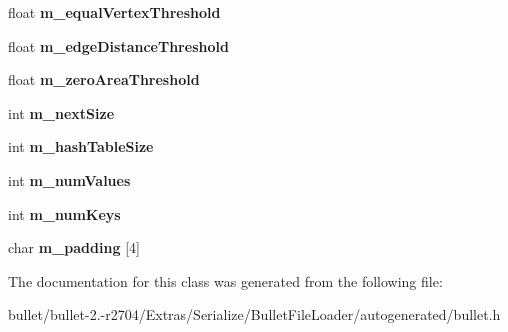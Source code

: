 \begin{DoxyCompactItemize}
\item 
\hypertarget{class_bullet_1_1bt_triangle_info_map_data_a3d20a9b4423bbe5ee25a98e108b2b547}{float {\bfseries m\+\_\+equal\+Vertex\+Threshold}}\label{class_bullet_1_1bt_triangle_info_map_data_a3d20a9b4423bbe5ee25a98e108b2b547}

\item 
\hypertarget{class_bullet_1_1bt_triangle_info_map_data_a624839226f59861b6bb05615c2f89897}{float {\bfseries m\+\_\+edge\+Distance\+Threshold}}\label{class_bullet_1_1bt_triangle_info_map_data_a624839226f59861b6bb05615c2f89897}

\item 
\hypertarget{class_bullet_1_1bt_triangle_info_map_data_a6fa47285cf7cad07875599dc72b6e471}{float {\bfseries m\+\_\+zero\+Area\+Threshold}}\label{class_bullet_1_1bt_triangle_info_map_data_a6fa47285cf7cad07875599dc72b6e471}

\item 
\hypertarget{class_bullet_1_1bt_triangle_info_map_data_a7acd7461e77f65b50046e53b9365bf0c}{int {\bfseries m\+\_\+next\+Size}}\label{class_bullet_1_1bt_triangle_info_map_data_a7acd7461e77f65b50046e53b9365bf0c}

\item 
\hypertarget{class_bullet_1_1bt_triangle_info_map_data_a0f029bb3fdbb787d58023b482d37efa2}{int {\bfseries m\+\_\+hash\+Table\+Size}}\label{class_bullet_1_1bt_triangle_info_map_data_a0f029bb3fdbb787d58023b482d37efa2}

\item 
\hypertarget{class_bullet_1_1bt_triangle_info_map_data_ace8aa9f5738da6bcd85b97e9d89dd30a}{int {\bfseries m\+\_\+num\+Values}}\label{class_bullet_1_1bt_triangle_info_map_data_ace8aa9f5738da6bcd85b97e9d89dd30a}

\item 
\hypertarget{class_bullet_1_1bt_triangle_info_map_data_aa8c0f7402c7e15317a8d5510105b87f5}{int {\bfseries m\+\_\+num\+Keys}}\label{class_bullet_1_1bt_triangle_info_map_data_aa8c0f7402c7e15317a8d5510105b87f5}

\item 
\hypertarget{class_bullet_1_1bt_triangle_info_map_data_a486552f5c9cd5ab1368b8a661d3b6498}{char {\bfseries m\+\_\+padding} \mbox{[}4\mbox{]}}\label{class_bullet_1_1bt_triangle_info_map_data_a486552f5c9cd5ab1368b8a661d3b6498}

\end{DoxyCompactItemize}


The documentation for this class was generated from the following file\+:\begin{DoxyCompactItemize}
\item 
bullet/bullet-\/2.-\/r2704/\+Extras/\+Serialize/\+Bullet\+File\+Loader/autogenerated/bullet.\+h\end{DoxyCompactItemize}
